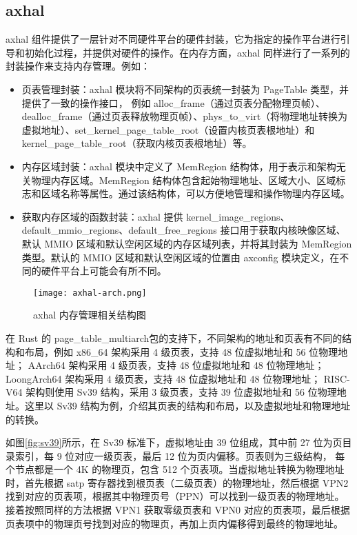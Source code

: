 \subsection{axhal}

axhal 组件提供了一层针对不同硬件平台的硬件封装，它为指定的操作平台进行引导和初始化过程，并提供对硬件的操作。在内存方面，axhal 同样进行了一系列的封装操作来支持内存管理。例如：

\begin{itemize}
\item 页表管理封装：axhal 模块将不同架构的页表统一封装为 PageTable 类型，并提供了一致的操作接口，
例如 alloc\_frame（通过页表分配物理页帧）、dealloc\_frame（通过页表释放物理页帧）、phys\_to\_virt（将物理地址转换为虚拟地址）、set\_kernel\_page\_table\_root（设置内核页表根地址）和kernel\_page\_table\_root（获取内核页表根地址）等。
\item 内存区域封装：axhal 模块中定义了 MemRegion 结构体，用于表示和架构无关物理内存区域。MemRegion 结构体包含起始物理地址、区域大小、区域标志和区域名称等属性。通过该结构体，可以方便地管理和操作物理内存区域。
\item 获取内存区域的函数封装：axhal 提供 kernel\_image\_regions、default\_mmio\_regions、default\_free\_regions 接口用于获取内核映像区域、默认 MMIO 区域和默认空闲区域的内存区域列表，并将其封装为 MemRegion 类型。默认的 MMIO 区域和默认空闲区域的位置由 axconfig 模块定义，在不同的硬件平台上可能会有所不同。
\end{itemize}

\begin{figure}
  \centering
  \texttt{[image: axhal-arch.png]}
  \caption{axhal 内存管理相关结构图}
  \label{fig:axhal-arch}
\end{figure}

在 Rust 的 page\_table\_multiarch包的支持下，不同架构的地址和页表有不同的结构和布局，例如 x86\_64 架构采用 4 级页表，支持 48 位虚拟地址和 56 位物理地址；
AArch64 架构采用 4 级页表，支持 48 位虚拟地址和 48 位物理地址；LoongArch64 架构采用 4 级页表，支持 48 位虚拟地址和 48 位物理地址\cite{1024579329.nh}；
RISC-V64 架构则使用 Sv39 结构，采用 3 级页表，支持 39 位虚拟地址和 56 位物理地址。这里以 Sv39 结构为例，介绍其页表的结构和布局，以及虚拟地址和物理地址的转换。

如图\ref{fig:sv39}所示，在 Sv39 标准下，虚拟地址由 39 位组成，其中前 27 位为页目录索引，每 9 位对应一级页表，最后 12 位为页内偏移。页表则为三级结构，
每个节点都是一个 4K 的物理页，包含 512 个页表项。当虚拟地址转换为物理地址时，首先根据 satp 寄存器找到根页表（二级页表）的物理地址，然后根据 VPN2 找到对应的页表项，根据其中物理页号（PPN）可以找到一级页表的物理地址。
接着按照同样的方法根据 VPN1 获取零级页表和 VPN0 对应的页表项，最后根据页表项中的物理页号找到对应的物理页，再加上页内偏移得到最终的物理地址\cite{1024446289.nh}。


